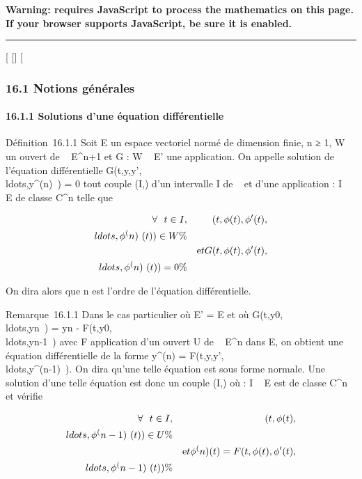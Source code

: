 \textbf{Warning: 
requires JavaScript to process the mathematics on this page.\\ If your
browser supports JavaScript, be sure it is enabled.}

\begin{center}\rule{3in}{0.4pt}\end{center}

{[}
{[}{]}
{[}

\subsubsection{16.1 Notions générales}

\paragraph{16.1.1 Solutions d'une équation différentielle}

Définition~16.1.1 Soit E un espace vectoriel normé de dimension finie, n
≥ 1, W un ouvert de ~ \times E^n+1 et G : W \rightarrow~ E' une application.
On appelle solution de l'équation différentielle
G(t,y,y',\\ldots,y^(n)~)
= 0 tout couple (I,\phi) d'un intervalle I de ~ et d'une application \phi : I
\rightarrow~ E de classe C^n telle que

\begin{align*} \forall~~t \in I,&
&
(t,\phi(t),\phi'(t),\\ldots,\phi^(n)~(t))
\in W \%& \\ & & \text
et
G(t,\phi(t),\phi'(t),\\ldots,\phi^(n)~(t))
= 0\%& \\
\end{align*}

On dira alors que n est l'ordre de l'équation différentielle.

Remarque~16.1.1 Dans le cas particulier où E' = E et où
G(t,y0,\\ldots,yn~)
= yn -
F(t,y0,\\ldots,yn-1~)
avec F application d'un ouvert U de ~ \times E^n dans E, on
obtient une équation différentielle de la forme y^(n) =
F(t,y,y',\\ldots,y^(n-1)~).
On dira qu'une telle équation est sous forme normale. Une solution d'une
telle équation est donc un couple (I,\phi) où \phi : I \rightarrow~ E est de classe
C^n et vérifie

\begin{align*} \forall~~t \in I,&
&
(t,\phi(t),\\ldots,\phi^(n-1)~(t))
\in U \%& \\ & & \text
et \phi^(n)(t) =
F(t,\phi(t),\phi'(t),\\ldots,\phi^(n-1)~(t))\%&
\\ \end{align*}

